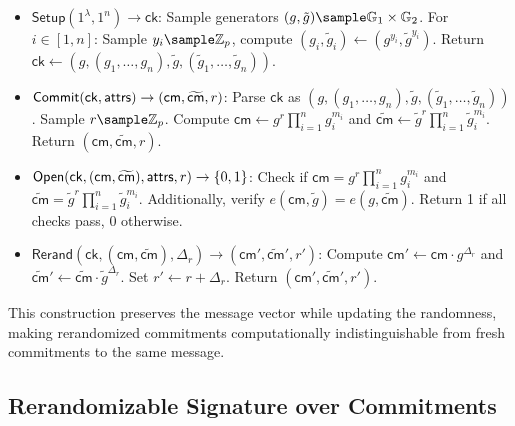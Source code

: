 \begin{itemize}
    \item $\mathsf{Setup}(1^\lambda, 1^n) \to \mathsf{ck}$:
    Sample generators $(g, \tilde{g}) \sample \G_1 \times \G_2$.
    For $i \in [1,n]$: Sample $y_i \sample \Z_p$, compute $(g_i, \tilde{g}_i) \gets (g^{y_i}, \tilde{g}^{y_i})$.
    Return $\mathsf{ck} \gets (g, (g_1,\ldots,g_n), \tilde{g}, (\tilde{g}_1,\ldots,\tilde{g}_n))$.
    
    \item $\mathsf{Commit}(\mathsf{ck}, \mathsf{attrs}) \to (\mathsf{cm}, \widetilde{\mathsf{cm}}, r)$:
    Parse $\mathsf{ck}$ as $(g, (g_1,\ldots,g_n), \tilde{g}, (\tilde{g}_1,\ldots,\tilde{g}_n))$.
    Sample $r \sample \Z_p$.
    Compute $\mathsf{cm} \gets g^r \prod_{i=1}^n g_i^{m_i}$ and $\widetilde{\mathsf{cm}} \gets \tilde{g}^r \prod_{i=1}^n \tilde{g}_i^{m_i}$.
    Return $(\mathsf{cm}, \widetilde{\mathsf{cm}}, r)$.
    
    \item $\mathsf{Open}(\mathsf{ck}, (\mathsf{cm}, \widetilde{\mathsf{cm}}), \mathsf{attrs}, r) \to \{0,1\}$:
    Check if $\mathsf{cm} = g^r \prod_{i=1}^n g_i^{m_i}$ and $\widetilde{\mathsf{cm}} = \tilde{g}^r \prod_{i=1}^n \tilde{g}_i^{m_i}$.
    Additionally, verify $e(\mathsf{cm}, \tilde{g}) = e(g, \widetilde{\mathsf{cm}})$.
    Return 1 if all checks pass, 0 otherwise.
    
    \item $\mathsf{Rerand}(\mathsf{ck}, (\mathsf{cm}, \widetilde{\mathsf{cm}}), \Delta_r) \to ({\mathsf{cm}}', \widetilde{\mathsf{cm}}', r')$:
    Compute ${\mathsf{cm}}' \gets \mathsf{cm} \cdot g^{\Delta_r}$ and $\widetilde{\mathsf{cm}}' \gets \widetilde{\mathsf{cm}} \cdot \tilde{g}^{\Delta_r}$.
    Set $r' \gets r + \Delta_r$.
    Return $({\mathsf{cm}}', \widetilde{\mathsf{cm}}', r')$.
\end{itemize}

This construction preserves the message vector while updating the randomness, making rerandomized commitments computationally indistinguishable from fresh commitments to the same message.









\subsection{Rerandomizable Signature over Commitments}\label{sec:commitment}



